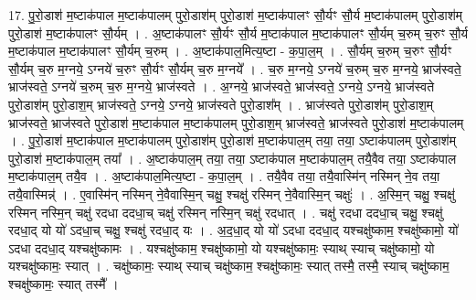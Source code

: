 \documentclass[17pt]{extarticle}
\begin{document}
17. पु॒रो॒डाश॑ म॒ष्टाक॑पाल म॒ष्टाक॑पालम् पुरो॒डाश॑म् पुरो॒डाश॑ म॒ष्टाक॑पालꣳ सौ॒र्यꣳ सौ॒र्य म॒ष्टाक॑पालम् पुरो॒डाश॑म् पुरो॒डाश॑ म॒ष्टाक॑पालꣳ सौ॒र्यम् । . अ॒ष्टाक॑पालꣳ सौ॒र्यꣳ सौ॒र्य म॒ष्टाक॑पाल म॒ष्टाक॑पालꣳ सौ॒र्यम् च॒रुम् च॒रुꣳ सौ॒र्य म॒ष्टाक॑पाल म॒ष्टाक॑पालꣳ सौ॒र्यम् च॒रुम् । . अ॒ष्टाक॑पाल॒मित्य॒ष्टा - क॒पा॒ल॒म् । . सौ॒र्यम् च॒रुम् च॒रुꣳ सौ॒र्यꣳ सौ॒र्यम् च॒रु म॒ग्नये॒ ऽग्नये॑ च॒रुꣳ सौ॒र्यꣳ सौ॒र्यम् च॒रु म॒ग्नये᳚ । . च॒रु म॒ग्नये॒ ऽग्नये॑ च॒रुम् च॒रु म॒ग्नये॒ भ्राज॑स्वते॒ भ्राज॑स्वते॒ ऽग्नये॑ च॒रुम् च॒रु म॒ग्नये॒ भ्राज॑स्वते । . अ॒ग्नये॒ भ्राज॑स्वते॒ भ्राज॑स्वते॒ ऽग्नये॒ ऽग्नये॒ भ्राज॑स्वते पुरो॒डाश॑म् पुरो॒डाश॒म् भ्राज॑स्वते॒ ऽग्नये॒ ऽग्नये॒ भ्राज॑स्वते पुरो॒डाश᳚म् । . भ्राज॑स्वते पुरो॒डाश॑म् पुरो॒डाश॒म् भ्राज॑स्वते॒ भ्राज॑स्वते पुरो॒डाश॑ म॒ष्टाक॑पाल म॒ष्टाक॑पालम् पुरो॒डाश॒म् भ्राज॑स्वते॒ भ्राज॑स्वते पुरो॒डाश॑ म॒ष्टाक॑पालम् । . पु॒रो॒डाश॑ म॒ष्टाक॑पाल म॒ष्टाक॑पालम् पुरो॒डाश॑म् पुरो॒डाश॑ म॒ष्टाक॑पाल॒म् तया॒ तया॒ ऽष्टाक॑पालम् पुरो॒डाश॑म् पुरो॒डाश॑ म॒ष्टाक॑पाल॒म् तया᳚ । . अ॒ष्टाक॑पाल॒म् तया॒ तया॒ ऽष्टाक॑पाल म॒ष्टाक॑पाल॒म् तयै॒वैव तया॒ ऽष्टाक॑पाल म॒ष्टाक॑पाल॒म् तयै॒व । . अ॒ष्टाक॑पाल॒मित्य॒ष्टा - क॒पा॒ल॒म् । . तयै॒वैव तया॒ तयै॒वास्मि॑न् नस्मिन् ने॒व तया॒ तयै॒वास्मिन्न्॑ । . ए॒वास्मि॑न् नस्मिन् ने॒वैवास्मि॒न् चक्षु॒ श्चक्षु॑ रस्मिन् ने॒वैवास्मि॒न् चक्षुः॑ । . अ॒स्मि॒न् चक्षु॒ श्चक्षु॑ रस्मिन् नस्मि॒न् चक्षु॑ रदधा ददधा॒च् चक्षु॑ रस्मिन् नस्मि॒न् चक्षु॑ रदधात् । . चक्षु॑ रदधा ददधा॒च् चक्षु॒ श्चक्षु॑ रदधा॒द् यो यो॑ ऽदधा॒च् चक्षु॒ श्चक्षु॑ रदधा॒द् यः । . अ॒द॒धा॒द् यो यो॑ ऽदधा ददधा॒द् यश्चक्षु॑ष्काम॒ श्चक्षु॑ष्कामो॒ यो॑ ऽदधा ददधा॒द् यश्चक्षु॑ष्कामः । . यश्चक्षु॑ष्काम॒ श्चक्षु॑ष्कामो॒ यो यश्चक्षु॑ष्कामः॒ स्याथ् स्याच् चक्षु॑ष्कामो॒ यो यश्चक्षु॑ष्कामः॒ स्यात् । . चक्षु॑ष्कामः॒ स्याथ् स्याच् चक्षु॑ष्काम॒ श्चक्षु॑ष्कामः॒ स्यात् तस्मै॒ तस्मै॒ स्याच् चक्षु॑ष्काम॒ श्चक्षु॑ष्कामः॒ स्यात् तस्मै᳚ । \newline
\end{document}
